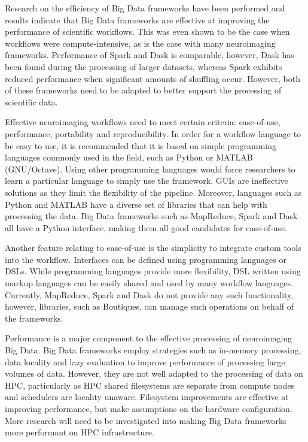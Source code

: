 \documentclass{report}
\newcommand{\weird}[1]{\uwave{#1}}
\begin{document}
        Research on the efficiency of Big Data frameworks have been performed 
        and results indicate that Big Data frameworks are effective at 
        improving the performance of scientific workflows. This was even shown
        to be the case when workflows were compute-intensive, as is the case 
        with many neuroimaging frameworks. Performance of Spark and Dask is 
        comparable, however, Dask has been found \weird{to be lose efficiency} during 
        the processing of larger datasets, whereas Spark exhibits reduced 
        performance when significant amounts of shuffling occur. However, both
        of these frameworks need to be adapted to better support the processing
        of scientific data. 

        Effective neuroimaging workflows need to meet certain criteria: 
        ease-of-use, performance, portability and reproducibility. In order for
        a workflow language to be easy to use, it is recommended that it is 
        based on simple programming languages commonly used in the field, such 
        as Python or MATLAB (GNU/Octave). Using other programming languages 
        would force researchers to learn a particular language to simply use the
        framework. GUIs are ineffective solutions as they limit the flexibility
        of the pipeline. Moreover, languages such as Python and MATLAB have a 
        diverse set of libraries that can help with processing the data. Big
        Data frameworks such as MapReduce, Spark and Dask all have a Python 
        interface, making them all good candidates for ease-of-use.


        Another feature relating to ease-of-use is the simplicity to integrate
        custom tools into the workflow. Interfaces can be defined using programming
        languages or DSLs. While programming languages provide more flexibility,
        DSL written using markup languages can be easily shared and used by 
        many workflow languages. Currently, MapReduce, Spark and Dask do not
        provide any such functionality, however, libraries, such as Boutiques,
        can manage such operations on behalf of the frameworks.


        Performance is a major component to the effective processing of 
        neuroimaging Big Data. Big Data frameworks employ strategies such as 
        in-memory processing, data locality and lazy evaluation to improve
        performance of processing large volumes of data. However, they are not
        well adapted to the processing of data on HPC, particularly as HPC 
        shared filesystems are separate from compute nodes and schedulers are 
        locality unaware. Filesystem improvements are effective at improving 
        performance, but make assumptions on the hardware configuration. More
        research will need to be investigated into making Big Data frameworks
        more performant on HPC infrastructure.
\end{document}
